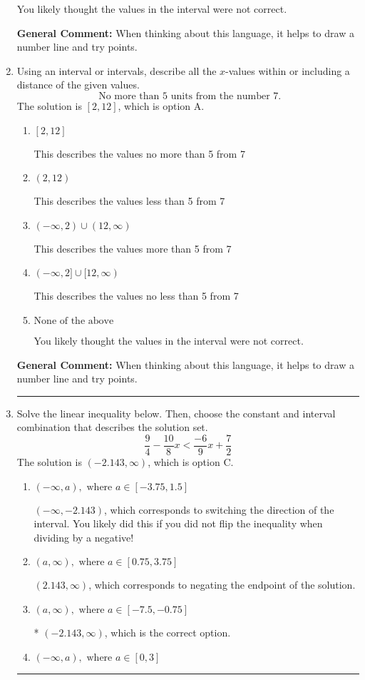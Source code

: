\documentclass{extbook}[14pt]
\newcommand{\litem}[1]{\item #1

\rule{\textwidth}{0.4pt}}
\begin{document}
\begin{enumerate}
{\begin{enumerate}[label=\Alph*.]
You likely thought the values in the interval were not correct.
\end{enumerate}

\textbf{General Comment:} When thinking about this language, it helps to draw a number line and try points.
}
\litem{
Using an interval or intervals, describe all the $x$-values within or including a distance of the given values.
\[ \text{ No more than } 5 \text{ units from the number } 7. \]The solution is \( [2, 12] \), which is option A.\begin{enumerate}[label=\Alph*.]
\item \( [2, 12] \)

This describes the values no more than 5 from 7
\item \( (2, 12) \)

This describes the values less than 5 from 7
\item \( (-\infty, 2) \cup (12, \infty) \)

This describes the values more than 5 from 7
\item \( (-\infty, 2] \cup [12, \infty) \)

This describes the values no less than 5 from 7
\item \( \text{None of the above} \)

You likely thought the values in the interval were not correct.
\end{enumerate}

\textbf{General Comment:} When thinking about this language, it helps to draw a number line and try points.
}
\litem{
Solve the linear inequality below. Then, choose the constant and interval combination that describes the solution set.
\[ \frac{9}{4} - \frac{10}{8} x < \frac{-6}{9} x + \frac{7}{2} \]The solution is \( (-2.143, \infty) \), which is option C.\begin{enumerate}[label=\Alph*.]
\item \( (-\infty, a), \text{ where } a \in [-3.75, 1.5] \)

 $(-\infty, -2.143)$, which corresponds to switching the direction of the interval. You likely did this if you did not flip the inequality when dividing by a negative!
\item \( (a, \infty), \text{ where } a \in [0.75, 3.75] \)

 $(2.143, \infty)$, which corresponds to negating the endpoint of the solution.
\item \( (a, \infty), \text{ where } a \in [-7.5, -0.75] \)

* $(-2.143, \infty)$, which is the correct option.
\item \( (-\infty, a), \text{ where } a \in [0, 3] \)


\end{enumerate}}
\end{enumerate}
\end{document}
